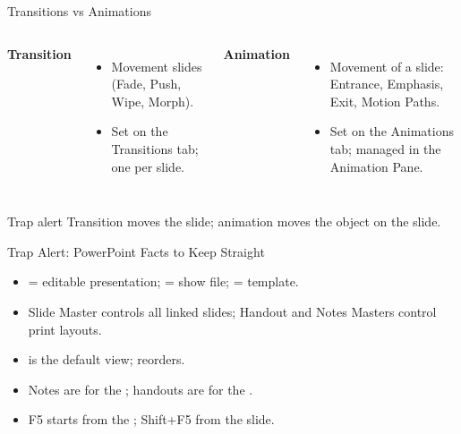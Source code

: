\documentclass[aspectratio=169]{beamer}
\begin{document}
\begin{frame}{Transitions vs Animations}
  \begin{columns}[T]
      \textbf{Transition}
      \begin{itemize}
        \item Movement  slides (Fade, Push, Wipe, Morph).
        \item Set on the Transitions tab; one per slide.
      \end{itemize}
      \textbf{Animation}
      \begin{itemize}
        \item Movement of  a slide: Entrance, Emphasis, Exit,
          Motion Paths.
        \item Set on the Animations tab; managed in the Animation Pane.
      \end{itemize}
  \end{columns}
  \vspace{0.3cm}
  \begin{alertblock}{Trap alert}
    Transition moves the slide; animation moves the object on the slide.
  \end{alertblock}
\end{frame}

\begin{frame}{Trap Alert: PowerPoint Facts to Keep Straight}
  \begin{itemize}
    \item {} = editable presentation;  = show file;
       = template.
    \item Slide Master controls all linked slides; Handout and Notes Masters
      control print layouts.
    \item {} is the default view;  reorders.
    \item Notes are for the ; handouts are for the
      .
    \item F5 starts from the ; Shift+F5 from the
       slide.
  \end{itemize}
\end{frame}
\end{document}
